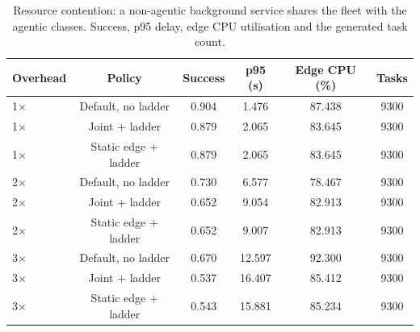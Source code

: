 \begin{table}
\centering
\footnotesize
\caption{Resource contention: a non-agentic background service shares the fleet with the agentic classes. Success, p95 delay, edge CPU utilisation and the generated task count.}
\label{tab:p2-contention}
\begin{tabular}{lccccc}
\toprule
Overhead & Policy & Success & p95 (s) & Edge CPU (\%) & Tasks \\
\midrule
1$\times$ & Default, no ladder & 0.904 & 1.476 & 87.438 & 9300 \\
1$\times$ & Joint + ladder & 0.879 & 2.065 & 83.645 & 9300 \\
1$\times$ & Static edge + ladder & 0.879 & 2.065 & 83.645 & 9300 \\
2$\times$ & Default, no ladder & 0.730 & 6.577 & 78.467 & 9300 \\
2$\times$ & Joint + ladder & 0.652 & 9.054 & 82.913 & 9300 \\
2$\times$ & Static edge + ladder & 0.652 & 9.007 & 82.913 & 9300 \\
3$\times$ & Default, no ladder & 0.670 & 12.597 & 92.300 & 9300 \\
3$\times$ & Joint + ladder & 0.537 & 16.407 & 85.412 & 9300 \\
3$\times$ & Static edge + ladder & 0.543 & 15.881 & 85.234 & 9300 \\
\bottomrule
\end{tabular}
\par\vspace{2pt}{\footnotesize\raggedright The background class is not scaled by the agentic overhead model; it only occupies edge capacity.\par}
\end{table}
